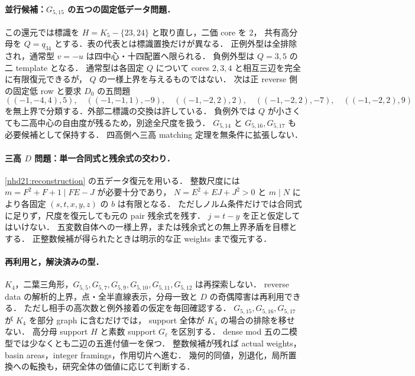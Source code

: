 \paragraph{並行候補：$G_{5,15}$ の五つの固定低データ問題．}
この還元では標識を $H=K_5-\{23,24\}$ と取り直し，二価 core を $2$，
共有高分母を $Q=q_{34}$ とする．表の代表とは標識置換だけが異なる．
正例外型は全排除され，通常型 $v=-u$ は四中心・十四配置へ限られる．
負例外型は $Q=3,5$ の二 template となる．
通常型は各固定 $Q$ について cores $2,3,4$ と相互三辺を完全に有限復元できるが，
$Q$ の一様上界を与えるものではない．
次は正 reverse 側の固定低 row と要求 $D_0$ の五問題
\[
((-1,-4,4),5),\quad ((-1,-1,1),-9),\quad
((-1,-2,2),2),\quad ((-1,-2,2),-7),\quad ((-1,-2,2),9)
\]
を無上界で分類する．外部二標識の交換は許している．
負例外では $Q$ が小さくても二高中心の自由度が残るため，別途全尺度を扱う．
$G_{5,14}$ と $G_{5,16},G_{5,17}$ も必要候補として保持する．
四高側へ三高 matching 定理を無条件に拡張しない．

\paragraph{三高 $D$ 問題：単一合同式と残余式の交わり．}
\ref{nhd21:reconstruction} の五データ復元を用いる．
整数尺度には $m=F^2+F+1\mid FE-J$ が必要十分であり，
$N=E^2+EJ+J^2>0$ と $m\mid N$ により各固定 $(s,t,x,y,z)$ の $b$ は有限となる．
ただしノルム条件だけでは合同式に足りず，尺度を復元しても元の pair 残余式を残す．
$j=t-y$ を正と仮定してはいけない．
五変数自体への一様上界，または残余式との無上界矛盾を目標とする．
正整数候補が得られたときは明示的な正 weights まで復元する．

\paragraph{再利用と，解決済みの型．}
$K_4$，二葉三角形，$G_{5,5},G_{5,7},G_{5,9},G_{5,10},G_{5,11},G_{5,12}$ は再探索しない．
reverse data の解析的上界，点・全半直線表示，分母一致と $D$ の奇偶障害は再利用できる．
ただし相手の高次数と例外接着の仮定を毎回確認する．
$G_{5,15},G_{5,16},G_{5,17}$ が $K_4$ を部分 graph に含むだけでは，
support 全体が $K_4$ の場合の排除を移せない．
高分母 support $H$ と素数 support $G_\ell$ を区別する．
dense mod 五の二模型では少なくとも二辺の五進付値一を保つ．
整数候補が残れば actual weights，basin areas，integer framings，作用切片へ進む．
幾何的同値，別退化，局所置換への転換も，研究全体の価値に応じて判断する．
